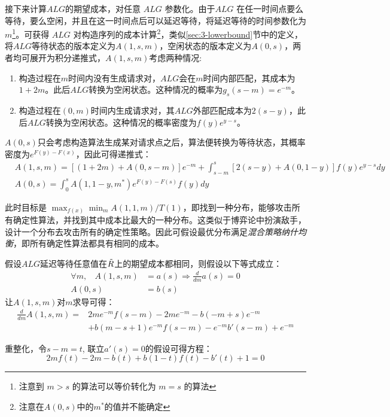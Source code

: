 接下来计算$ALG$的期望成本，对任意 $ALG$ 参数化。由于$ALG$ 在任一时间点要么等待，要么空闲，并且在这一时间点后可以延迟等待，将延迟等待的时间参数化为 $m$\footnote{注意到 $m>s$ 的算法可以等价转化为 $m=s$ 的算法}。可获得 $ALG$ 对构造序列的成本计算\footnote{注意在$A(0,s)$中的$m^*$的值并不能确定}，类似\ref{sec:3-lowerbound}节中的定义，将$ALG$等待状态的版本定义为$A(1,s,m)$，空闲状态的版本定义为$A(0,s)$，两者均可展开为积分递推式，$A(1,s,m)$考虑两种情况:
 \renewcommand{\labelenumi}{(\arabic{enumi})}
\begin{enumerate}[align=left, labelsep=-0.5em, itemindent=3.6em, leftmargin=0em]
    \item 构造过程在$m$时间内没有生成请求对，$ALG$会在$m$时间内部匹配，其成本为$1+2m$。此后$ALG$转换为空闲状态。这种情况的概率为$g_s(s-m)=e^{-m}$。
    \item 构造过程在$(0, m)$时间内生成请求对，其$ALG$外部匹配成本为$2(s-y)$，此后$ALG$转换为空闲状态。这种情况的概率密度为$f(y)e^{y-s}$。
\end{enumerate}
$A(0, s)$只会考虑构造算法生成某对请求点之后，算法便转换为等待状态，其概率密度为$e^{F(y)-F(x)}$，因此可得递推式：
\begin{align}
    \nonumber & A(1, s, m)=[(1+2m)+A(0, s-m)]e^{-m}+\int_{s-m}^s[2(s-y)+A(0, 1-y)]f(y)e^{y-s}dy \\
    &A(0, s)=\int_0^s A(1, 1-y, m^*) e^{F(y)-F(s)}f(y)dy 
\end{align}

此时目标是 $\max_{f(x)}\min_{m}{A(1, 1, m)/T(1)}$，即找到一种分布，能够攻击所有确定性算法，并找到其中成本比最大的一种分布。这类似于博弈论中扮演敌手，设计一个分布去攻击所有的确定性策略。因此可假设最优分布满足\emph{混合策略纳什均衡}，即所有确定性算法都具有相同的成本。

假设$ALG$延迟等待任意值在$\tilde{R}$上的期望成本都相同，则假设以下等式成立：
\begin{align}
     \label{eq:assumption}\forall m, ~~~~  A(1, s, m) & = a(s) \Rightarrow \frac{d}{dm}a(s) = 0\\ 
    A(0, s) & = b(s) 
\end{align}
让$A(1, s, m)$对$m$求导可得：
\begin{align}
   \nonumber \frac{d}{dm}A(1,s,m) = & 2 m e^{- m} f(s-m) - 2 m e^{- m} - b{\left(- m + s \right)} e^{- m} \\
   & + b{\left(m - s + 1 \right)} e^{- m} f(s-m) - e^{- m} b'(s-m) + e^{- m}
\end{align}

重整化，令$s-m = t$, 联立$a'(s)=0$的假设可得方程：
\begin{equation} \label{eq:lowerbound_1}
    2mf(t) - 2m - b(t) + b(1-t)f(t) - b'(t) + 1 = 0 
\end{equation}

